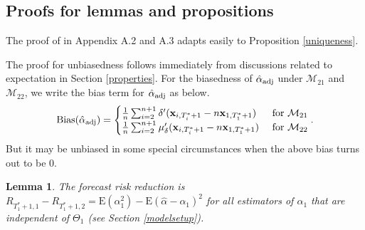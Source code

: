\documentclass[11pt]{article}
\def\mbf#1{\mathbf{#1}} %
\def\mrm#1{\mathrm{#1}} %
\def\mc#1{\mathcal{#1}} %
\def\E#1{\mathrm{E}(#1)} %
\newtheorem{lem}{Lemma}
\theoremstyle{definition}
\newenvironment{proof-of-proposition}[1][{}]{\noindent{\bf
    Proof of Proposition {#1}}
  \hspace*{.5em}}{\qed\bigskip\\}
\begin{document}
\subsection{Proofs for lemmas and propositions}

\begin{proof-of-proposition}[\ref{uniqueness}]
  The proof of \citet{li2019statistical} in Appendix A.2 and A.3 adapts easily to Proposition \ref{uniqueness}.
\end{proof-of-proposition}


\begin{proof-of-proposition}[\ref{unbiased}] The proof for unbiasedness follows immediately from discussions related to expectation in Section \ref{properties}. For the biasedness of  $\hat{\alpha}_{\rm adj}$ under $\mc{M}_{21}$ and $\mc{M}_{22}$, we write the bias term for $\hat{\alpha}_{\rm adj}$ as below.
\begin{align*}
  \mrm{Bias}(\hat{\alpha}_{\rm adj}) = 
  \begin{cases}
       \frac{1}{n} \sum_{i=2}^{n+1} \delta'(\mbf{x}_{i, T_i^*+1}-n\mbf{x}_{1, T_1^*+1})  & \text{ for } \mc{M}_{21}\\
    \frac{1}{n} \sum_{i=2}^{n+1} \mu_{\delta}'(\mbf{x}_{i, T_i^*+1}-n\mbf{x}_{1, T_1^*+1})  & \text{ for }\mc{M}_{22}
  \end{cases}.
\end{align*}
But it may be unbiased in some special circumstances when the above bias turns out to be 0. \end{proof-of-proposition}

\begin{lem}
  \label{risklemma} The forecast risk reduction is $R_{T_1^*+1,1}-R_{T_1^*+1,2}=\E{\alpha_1^2}-\E{\hat{\alpha}-\alpha_1}^2$ for all estimators of $\alpha_1$ that are independent of $\Theta_1$ (see Section \ref{modelsetup}).
\end{lem}
\end{document}
